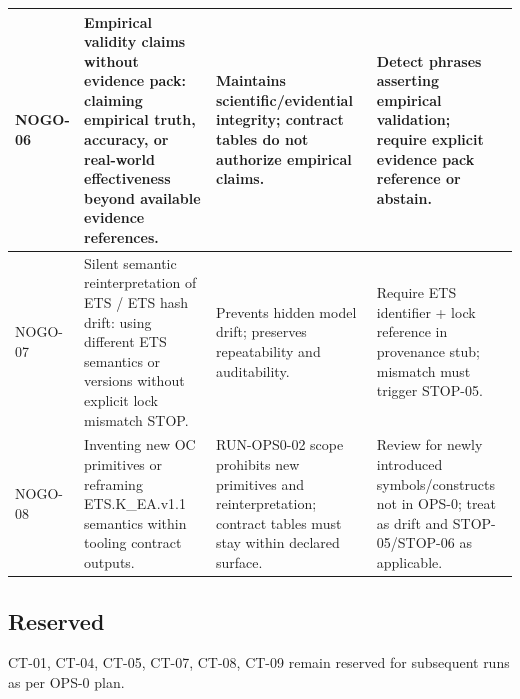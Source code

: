 \begin{longtable}{|p{1.8cm}|p{6.8cm}|p{5.2cm}|p{4.5cm}|}
NOGO-06 &
Empirical validity claims without evidence pack: claiming empirical truth, accuracy, or real-world effectiveness beyond available evidence references. &
Maintains scientific/evidential integrity; contract tables do not authorize empirical claims. &
Detect phrases asserting empirical validation; require explicit evidence pack reference or abstain. \\
\hline

NOGO-07 &
Silent semantic reinterpretation of ETS / ETS hash drift: using different ETS semantics or versions without explicit lock mismatch STOP. &
Prevents hidden model drift; preserves repeatability and auditability. &
Require ETS identifier + lock reference in provenance stub; mismatch must trigger STOP-05. \\
\hline

NOGO-08 &
Inventing new OC primitives or reframing ETS.K\_EA.v1.1 semantics within tooling contract outputs. &
RUN-OPS0-02 scope prohibits new primitives and reinterpretation; contract tables must stay within declared surface. &
Review for newly introduced symbols/constructs not in OPS-0; treat as drift and STOP-05/STOP-06 as applicable. \\
\hline

\end{longtable}
\endgroup

\subsection{Reserved}
CT-01, CT-04, CT-05, CT-07, CT-08, CT-09 remain reserved for subsequent runs as per OPS-0 plan.
